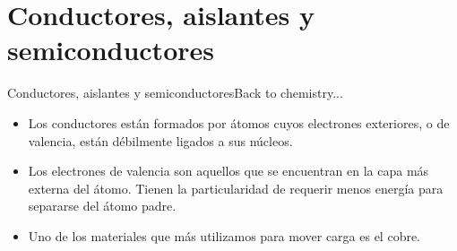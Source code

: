 \documentclass[10pt]{beamer}
\begin{document}
\section{Conductores, aislantes y semiconductores}
\begin{frame}{Conductores, aislantes y semiconductores}{Back to chemistry...}

\begin{itemize}
    \item Los conductores están formados por átomos cuyos electrones exteriores, o de valencia, están débilmente ligados a sus núcleos.
    \item Los electrones de valencia son aquellos que se encuentran en la capa más externa del átomo. Tienen la particularidad de requerir menos energía para separarse del átomo padre. 
    \item Uno de los materiales que más utilizamos para mover carga es el cobre.
\end{itemize}
\medskip
\begin{columns}[c]
\column{1.3in}
\column{1.3in}
\end{columns}

\end{frame}
\end{document}
